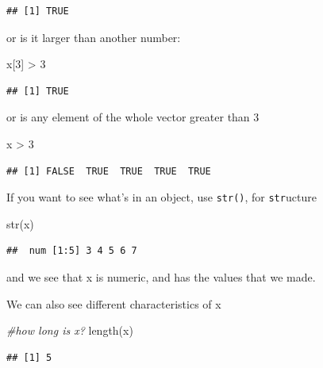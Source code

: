 \documentclass[
]{article}
\newenvironment{Shaded}{\begin{snugshade}}{\end{snugshade}}
\newcommand{\CommentTok}[1]{\textcolor[rgb]{0.56,0.35,0.01}{\textit{#1}}}
\newcommand{\DecValTok}[1]{\textcolor[rgb]{0.00,0.00,0.81}{#1}}
\newcommand{\FunctionTok}[1]{\textcolor[rgb]{0.00,0.00,0.00}{#1}}
\newcommand{\NormalTok}[1]{#1}
\newcommand{\SpecialCharTok}[1]{\textcolor[rgb]{0.00,0.00,0.00}{#1}}
\begin{document}
\begin{verbatim}
## [1] TRUE
\end{verbatim}

or is it larger than another number:

\begin{Shaded}
\begin{Highlighting}[]
\NormalTok{x[}\DecValTok{3}\NormalTok{] }\SpecialCharTok{\textgreater{}} \DecValTok{3}
\end{Highlighting}
\end{Shaded}

\begin{verbatim}
## [1] TRUE
\end{verbatim}

or is any element of the whole vector greater than 3

\begin{Shaded}
\begin{Highlighting}[]
\NormalTok{x }\SpecialCharTok{\textgreater{}} \DecValTok{3}
\end{Highlighting}
\end{Shaded}

\begin{verbatim}
## [1] FALSE  TRUE  TRUE  TRUE  TRUE
\end{verbatim}

If you want to see what's in an object, use \texttt{str()}, for \texttt{str}ucture

\begin{Shaded}
\begin{Highlighting}[]
\FunctionTok{str}\NormalTok{(x)}
\end{Highlighting}
\end{Shaded}

\begin{verbatim}
##  num [1:5] 3 4 5 6 7
\end{verbatim}

and we see that x is numeric, and has the values that we made.

We can also see different characteristics of x

\begin{Shaded}
\begin{Highlighting}[]
\CommentTok{\#how long is x?}
\FunctionTok{length}\NormalTok{(x)}
\end{Highlighting}
\end{Shaded}

\begin{verbatim}
## [1] 5
\end{verbatim}
\end{document}
